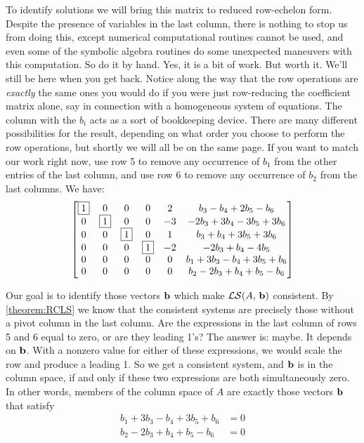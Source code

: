 \documentclass{ximera}
\begin{document}
\begin{example}
To identify solutions we will bring this matrix to reduced row-echelon
form.  Despite the presence of variables in the last column, there is
nothing to stop us from doing this, except numerical computational
routines cannot be used, and even some of the symbolic algebra
routines do some unexpected maneuvers with this computation.  So do it
by hand.  Yes, it is a bit of work.  But worth it.  We'll still be
here when you get back.  Notice along the way that the row operations
are \textit{exactly} the same ones you would do if you were just
row-reducing the coefficient matrix alone, say in connection with a
homogeneous system of equations.  The column with the $b_i$ acts as a
sort of bookkeeping device.  There are many different possibilities
for the result, depending on what order you choose to perform the row
operations, but shortly we will all be on the same page.  If you want
to match our work right now, use row 5 to remove any occurrence of
$b_1$ from the other entries of the last column, and use row 6 to
remove any occurrence of $b_2$ from the last columns. We have:
\begin{align*}
\begin{bmatrix}
 \fbox{1} & 0 & 0 & 0 & 2 & b_3 - b_4 + 2 b_5 - b_6\\
 0 & \fbox{1} & 0 & 0 & -3 & -2 b_3 + 3 b_4 - 3 b_5 + 3 b_6\\
 0 & 0 & \fbox{1} & 0 & 1 & b_3 + b_4 + 3 b_5 + 3 b_6\\
 0 & 0 & 0 & \fbox{1} & -2 & -2 b_3 + b_4 - 4 b_5\\
 0 & 0 & 0 & 0 & 0 & b_1 + 3 b_3 - b_4 + 3 b_5 + b_6\\
 0 & 0 & 0 & 0 & 0 & b_2 - 2 b_3 + b_4 + b_5 - b_6
\end{bmatrix}
\end{align*}

Our goal is to identify those vectors $\mathbf{b}$ which make
$\mathcal{LS}\!\left(A,\,\mathbf{b}\right)$ consistent.  By \ref{theorem:RCLS} we
know that the consistent systems are precisely those without a pivot
column in the last column.  Are the expressions in the last column of
rows 5 and 6 equal to zero, or are they leading 1's?  The answer is:
maybe.  It depends on $\mathbf{b}$.  With a nonzero value for either of
these expressions, we would scale the row and produce a leading 1.  So
we get a consistent system, and $\mathbf{b}$ is in the column space, if
and only if these two expressions are both simultaneously zero.  In
other words, members of the column space of $A$ are exactly those
vectors $\mathbf{b}$ that satisfy
\begin{align*}
b_1 + 3 b_3 - b_4 + 3 b_5 + b_6 & = 0\\
b_2 - 2 b_3 + b_4 + b_5 - b_6 & = 0
\end{align*}


\end{example}
\end{document}
